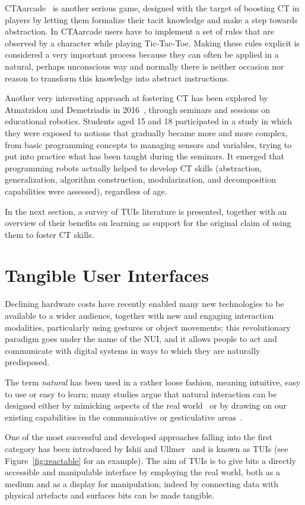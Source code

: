 CTAarcade~\cite{Lee:2014er} is another serious game, designed with the target of boosting \ac{CT} in players by letting them formalize their tacit knowledge and make a step towards abstraction. In CTAarcade users have to implement a set of rules that are observed by a character while playing Tic-Tac-Toe. Making these rules explicit is considered a very important process because they can often be applied in a natural, perhaps unconscious way and normally there is neither occasion nor reason to transform this knowledge into abstract instructions.

Another very interesting approach at fostering \ac{CT} has been explored by Atmatzidou and Demetriadis in 2016~\cite{atmatzidou2016advancing}, through seminars and sessions on educational robotics. Students aged 15 and 18 participated in a study in which they were exposed to notions that gradually became more and more complex, from basic programming concepts to managing sensors and variables, trying to put into practice what has been taught during the seminars. It emerged that programming robots actually helped to develop \ac{CT} skills (abstraction, generalization, algorithm construction, modularization, and decomposition capabilities were assessed), regardless of age.

In the next section, a survey of \acp{TUI} literature is presented, together with an overview of their benefits on learning as support for the original claim of using them to foster \ac{CT} skills.

\section{Tangible User Interfaces}\label{sec:tuirw}
Declining hardware costs have recently enabled many new technologies to be available to a wider audience, together with new and engaging interaction modalities, particularly using gestures or object movements; this revolutionary paradigm goes under the name of the \ac{NUI}, and it allows people to act and communicate with digital systems in ways to which they are naturally predisposed.

The term \textit{natural} has been used in a rather loose fashion, meaning intuitive, easy to use or easy to learn; many studies argue that natural interaction can be designed either by mimicking aspects of the real world~\cite{Jacob:2008dj} or by drawing on our existing capabilities in the communicative or gesticulative areas~\cite{Wigdor:2011:BNW:1995309}.

One of the most successful and developed approaches falling into the first category has been introduced by Ishii and Ullmer~\cite{Ishii:1997gy} and is known as \acp{TUI} (see Figure~\ref{fig:reactable} for an example). The aim of \acp{TUI} is to give bits a directly accessible and manipulable interface by employing the real world, both as a medium and as a display for manipulation; indeed by connecting data with physical artefacts and surfaces bits can be made tangible.

